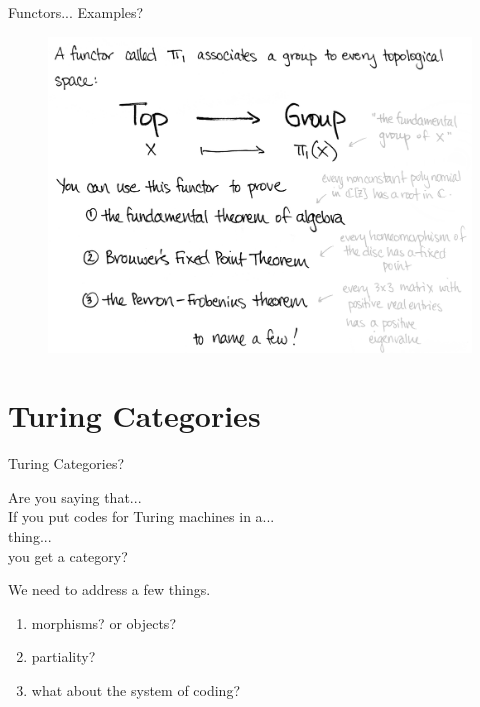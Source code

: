 \documentclass[10pt]{beamer}
\DeclareRobustCommand{\step}{\bigskip\noindent}
\begin{document}
\begin{frame}[fragile]{Functors... Examples?}

  \begin{figure}[H]
    \centering
    \includegraphics[width=\textwidth]{res/top-group-functor.jpeg}
  \end{figure}

\end{frame}

\section{Turing Categories}

\begin{frame}[fragile]{Turing Categories?}

  Are you saying that... \\
  \qquad If you put codes for Turing machines in a... \\
  \qquad \qquad thing... \\
  
  \step
  you get a category?

  We need to address a few things.

  \begin{enumerate}
    \item \alert{morphisms}? or \alert{objects}?
    \item \alert{partiality}?
    \item \alert{what about the system of coding}?
  \end{enumerate}

\end{frame}
\end{document}
